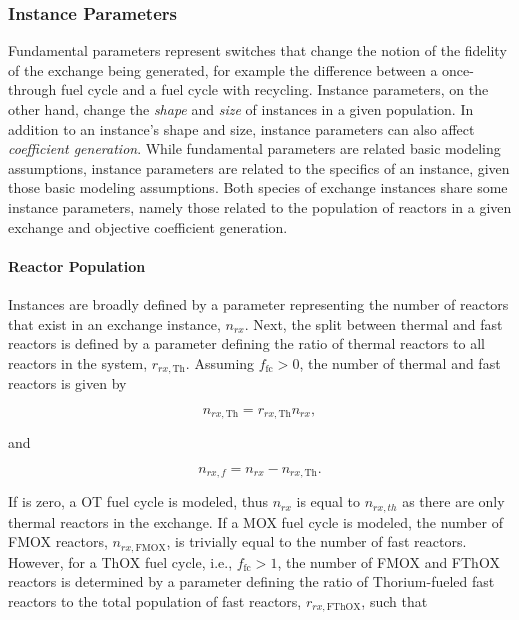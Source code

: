 \subsubsection{Instance Parameters}

Fundamental parameters represent switches that change the notion of the fidelity
of the exchange being generated, for example the difference between a
once-through fuel cycle and a fuel cycle with recycling. Instance parameters, on
the other hand, change the \textit{shape} and \textit{size} of instances in a
given population. In addition to an instance's shape and size, instance
parameters can also affect \textit{coefficient generation}. While fundamental
parameters are related basic modeling assumptions, instance parameters are
related to the specifics of an instance, given those basic modeling
assumptions. Both species of exchange instances share some instance parameters,
namely those related to the population of reactors in a given exchange and
objective coefficient generation.

\paragraph{Reactor Population}

Instances are broadly defined by a parameter representing the number of reactors
that exist in an exchange instance, $n_{rx}$. Next, the split between thermal
and fast reactors is defined by a parameter defining the ratio of thermal
reactors to all reactors in the system, $r_{rx, \text{Th}}$. Assuming $f_{\text{fc}} >
0$, the number of thermal and fast reactors is given by

\begin{equation}
n_{rx, \text{Th}} = r_{rx, \text{Th}} n_{rx},
\end{equation}

\noindent
and 

\begin{equation}
n_{rx, f} = n_{rx} - n_{rx, \text{Th}}.
\end{equation}

\noindent
If \ffc is zero, a OT fuel cycle is modeled, thus $n_{rx}$ is equal to $n_{rx,
  th}$ as there are only thermal reactors in the exchange. If a MOX fuel cycle
is modeled, the number of FMOX reactors, $n_{rx, \text{FMOX}}$, is trivially equal to
the number of fast reactors. However, for a ThOX fuel cycle, i.e.,
$f_{\text{fc}} > 1$, the number of FMOX and FThOX reactors is determined by a
parameter defining the ratio of Thorium-fueled fast reactors to the total
population of fast reactors, $r_{rx, \text{FThOX}}$, such that

